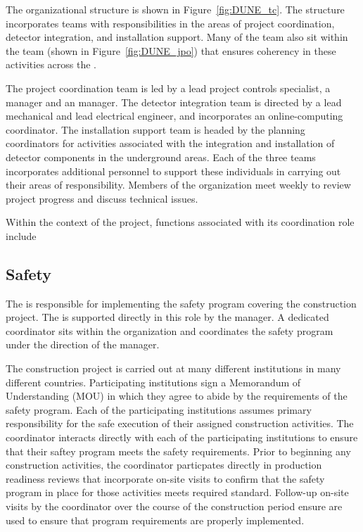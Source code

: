 The   organizational structure is shown in 
Figure~\ref{fig:DUNE_tc}.  The structure incorporates teams with 
responsibilities in the areas of project coordination, detector integration,
and installation support.  Many of the  team also sit within 
the  team (shown in Figure~\ref{fig:DUNE_jpo}) that ensures 
coherency in these activities across the . 

The project coordination team is led by a lead project controls
specialist, a  manager and an  manager.  The
detector integration team is directed by a lead mechanical and lead
electrical engineer, and incorporates an online-computing coordinator.
The installation support team is headed by the planning coordinators 
for activities associated with the integration and installation of 
detector components in the underground areas.  Each of the three 
teams incorporates additional personnel to support these individuals 
in carrying out their areas of responsibility.  Members of the 
 organization meet weekly to review project progress and 
discuss %
technical issues. 
     
Within the context of the  project,  functions 
associated with its coordination role include

\subsection{Safety}

The  is responsible for implementing the safety program
covering the  construction project.  The 
is supported directly in this role by the  
manager.  A dedicated   coordinator sits within
the  organization and coordinates the  safety
program under the direction of the   manager.

The  construction project is carried out at many different
institutions in many different countries.  Participating institutions
sign a Memorandum of Understanding (MOU) in which they agree to abide
by the requirements of the  safety program.  Each of the
participating institutions assumes primary responsibility for the safe
execution of their assigned construction activities.  The 
 coordinator interacts directly with each of the participating
institutions to ensure that their saftey program meets the 
safety requirements.  Prior to beginning any construction activities,
the   coordinator particpates directly in production
readiness reviews that incorporate on-site visits to confirm that the
safety program in place for those activities meets required standard.
Follow-up on-site visits by the   coordinator over
the course of the construction period ensure are used to ensure that
program requirements are properly implemented.


